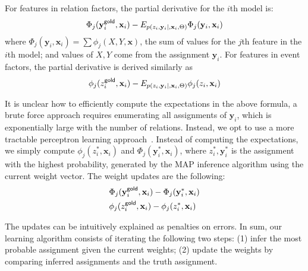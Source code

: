 For features in relation factors, the partial derivative for the $i$th model is: %
\[
\Phi_j(\mathbf{y}^{\mathsf{gold}}_i,\mathbf{x}_i)-E_{p(z_i,\mathbf{y}_i\mid ,\mathbf{x}_i,\Theta)}\Phi_j(\mathbf{y}_i,\mathbf{x}_i)
\]
where $\Phi_j(\mathbf{y}_i, \mathbf{x}_i)=\sum
\phi_j(X,Y,\mathbf{x})$, the sum of values for the $j$th
feature in the $i$th model; and values of $X,Y$ come from the assignment
$\mathbf{y}_i$. For features in event factors, the partial derivative is derived similarly as
\[
\phi_j(z^{\mathsf{gold}}_i,\mathbf{x}_i)-E_{p(z_i,\mathbf{y}_i\mid ,\mathbf{x}_i,\Theta)}\phi_j(z_i,\mathbf{x}_i)
\]

It is unclear how to efficiently compute the expectations in the above formula,
a brute force approach requires enumerating all assignments of $\mathbf{y}_i$, 
which is exponentially large with the number of relations. Instead, we
opt to use a more tractable perceptron
learning approach~\cite{collins02,hoffmann2011knowledge}. 
Instead of computing the expectations, we simply compute $\phi_j(z^*_i,\mathbf{x}_i)$ and
$\Phi_j(\mathbf{y}^*_i,\mathbf{x}_i)$, where $z^*_i,\mathbf{y}^*_i$ is 
the assignment with the highest probability, generated by the MAP
inference algorithm using the current weight vector. The weight updates are the following:
\begin{align}
&\Phi_j(\mathbf{y}^{\mathsf{gold}}_i,\mathbf{x}_i) - \Phi_j(\mathbf{y}^*_i,\mathbf{x}_i)\label{update_relation_variable}\\
&\phi_j(z^{\mathsf{gold}}_i,\mathbf{x}_i) - \phi_j(z^*_i,\mathbf{x}_i)
\end{align}

The updates can be intuitively explained as penalties on errors. In
sum, our learning algorithm consists of iterating the following two steps:
(1) infer the most probable assignment given the current weights; (2) update
the weights by comparing inferred assignments and the truth assignment.













